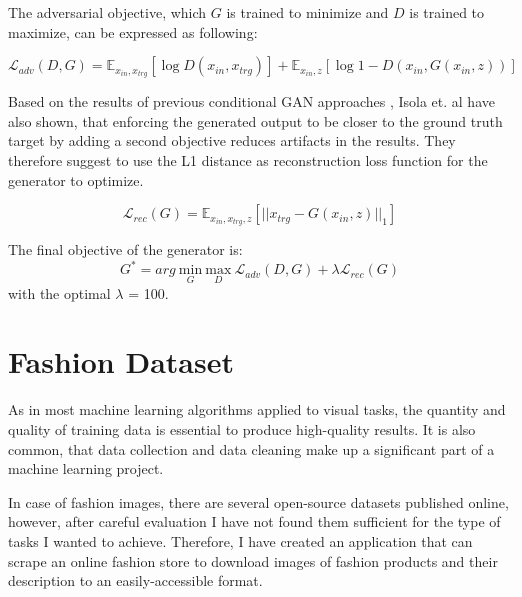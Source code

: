 \documentclass{article}
\begin{document}
The adversarial objective, which $G$ is trained to minimize and $D$ is trained to maximize, can be expressed as following:

\begin{equation}
\mathcal{L}_{adv}(D,G) = \mathbb{E}_{x_{in},x_{trg}}[\log D(x_{in},x_{trg})] + \mathbb{E}_{x_{in},z}[\log 1 - D(x_{in}, G(x_{in},z))]
\label{eq:pix2pix_minimax_cond}
\end{equation}

Based on the results of previous conditional GAN approaches \cite{pathak_context_2016}, Isola et. al \cite{isola_image--image_2016} have also shown, that enforcing the generated output to be closer to the ground truth target by adding a second objective reduces artifacts in the results. They therefore suggest to use the L1 distance as reconstruction loss function for the generator to optimize.

\begin{equation}
\mathcal{L}_{rec}(G) = \mathbb{E}_{x_{in},x_{trg},z}[||x_{trg}-G(x_{in},z)||_{1}]
\label{eq:pix2pix_loss_rec}
\end{equation}


The final objective of the generator is:
\begin{equation}
G^{*} = arg \ \underset{G}{\mathrm{min}} \ \underset{D}{\mathrm{max}} \ \mathcal{L}_{adv}(D,G) + \lambda \mathcal{L}_{rec}(G)
\end{equation}
with the optimal $\lambda$ = 100.


\section{Fashion Dataset}
As in most machine learning algorithms applied to visual tasks, the quantity and quality of training data is essential to produce high-quality results. It is also common, that data collection and data cleaning make up a significant part of a machine learning project.

In case of fashion images, there are several open-source datasets published online, however, after careful evaluation I have not found them sufficient for the type of tasks I wanted to achieve. Therefore, I have created an application that can scrape an online fashion store to download images of fashion products and their description to an easily-accessible format.

\end{document}
